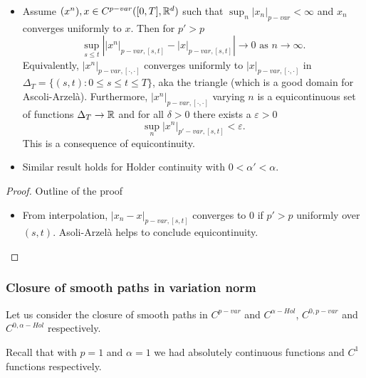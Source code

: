 \begin{corollary}
    \begin{itemize}
        \item Assume $(x^n), x \in C^{p-var}([0,T],\mathbb{R}^d)$ such that $\sup_n |x_n|_{p-var} < \infty$ and $x_n$ converges uniformly to $x$. Then for $p' > p$
        \begin{equation}
            \sup_{s \leq t} \left| |x^n|_{p-var,[s,t]} - |x|_{p-var,[s,t]} \right| \rightarrow 0 \text{ as } n \rightarrow \infty.
        \end{equation} 
        Equivalently, $|x^n|_{p-var,[\cdot,\cdot]}$ converges uniformly to $|x|_{p-var,[\cdot,\cdot]}$ in $\Delta_T = \{ (s,t): 0 \leq s \leq t \leq T \}$, aka the triangle (which is a good domain for Ascoli-Arzelà).
        Furthermore, $|x^n|_{p-var,[\cdot,\cdot]}$ varying $n$ is a equicontinuous set of functions $\Delta_T \rightarrow \mathbb{R}$ and for all $\delta > 0$ there exists a $\varepsilon > 0$ 
        \begin{equation}
            \sup_n |x^n|_{p'-var,[s,t]} < \varepsilon.
        \end{equation}
        This is a consequence of equicontinuity.
        \item Similar result holds for Holder continuity with $0 < \alpha' < \alpha.$
    \end{itemize}
\end{corollary}
\begin{proof}{Outline of the proof}
    \begin{itemize}
        \item From interpolation, $|x_n - x|_{p-var,[s,t]}$ converges to $0$ if $p' > p$ uniformly over $(s,t)$. Asoli-Arzelà helps to conclude equicontinuity.
    \end{itemize}
\end{proof}

\subsubsection{Closure of smooth paths in variation norm}

Let us consider the closure of smooth paths in $C^{p-var}$ and $C^{\alpha-Hol}$, $C^{0,p-var}$ and $C^{0,\alpha-Hol}$ respectively.

Recall that with $p = 1$ and $\alpha = 1$ we had absolutely continuous functions and $C^1$ functions respectively.

